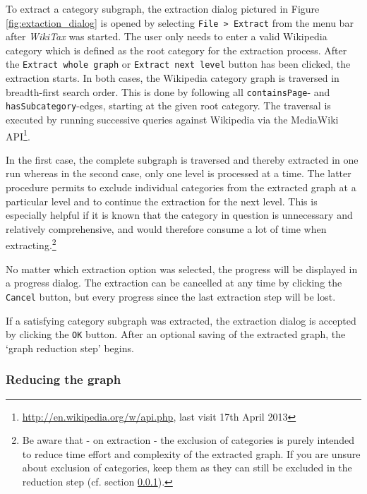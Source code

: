 \documentclass{scrartcl}
\begin{document}
To extract a category subgraph, the extraction dialog pictured in Figure \ref{fig:extaction_dialog} is opened by selecting \texttt{File > Extract} from the menu bar after \emph{WikiTax} was started. The user only needs to enter a valid Wikipedia category which is defined as the root category for the extraction process. After the \texttt{Extract whole graph} or \texttt{Extract next level} button has been clicked, the extraction starts. In both cases, the Wikipedia category graph is traversed in breadth-first search order. This is done by following all \texttt{containsPage}- and \texttt{hasSubcategory}-edges, starting at the given root category. The traversal is executed by running successive queries against Wikipedia via the MediaWiki API\footnote{\url{http://en.wikipedia.org/w/api.php}, last visit 17th April 2013}.

In the first case, the complete subgraph is traversed and thereby extracted in one run whereas in the second case, only one level is processed at a time. The latter procedure permits to exclude individual categories from the extracted graph at a particular level and to continue the extraction for the next level. This is especially helpful if it is known that the category in question is unnecessary and relatively comprehensive, and would therefore consume a lot of time when extracting.\footnote{Be aware that - on extraction - the exclusion of categories is purely intended to reduce time effort and complexity of the extracted graph. If you are unsure about exclusion of categories, keep them as they can still be excluded in the reduction step (cf. section \ref{sec:reduce}).} 

No matter which extraction option was selected, the progress will be displayed in a progress dialog. The extraction can be cancelled at any time by clicking the \texttt{Cancel} button, but every progress since the last extraction step will be lost.

If a satisfying category subgraph was extracted, the extraction dialog is accepted by clicking the \texttt{OK} button. After an optional saving of the extracted graph, the `graph reduction step' begins.

\subsubsection{Reducing the graph}
\label{sec:reduce}
\end{document}
